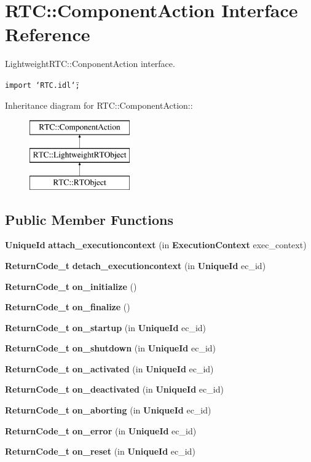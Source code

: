 \section{RTC::Component\-Action Interface Reference}
\label{interfaceRTC_1_1ComponentAction}
Lightweight\-RTC::Conponent\-Action interface.  


{\tt import \char`\"{}RTC.idl\char`\"{};}

Inheritance diagram for RTC::Component\-Action::\begin{figure}[H]
\begin{center}
\leavevmode
\includegraphics[height=3cm]{interfaceRTC_1_1ComponentAction}
\end{center}
\end{figure}
\subsection*{Public Member Functions}
\begin{CompactItemize}
\item 
{\bf Unique\-Id} {\bf attach\_\-executioncontext} (in {\bf Execution\-Context} exec\_\-context)
\item 
{\bf Return\-Code\_\-t} {\bf detach\_\-executioncontext} (in {\bf Unique\-Id} ec\_\-id)
\item 
{\bf Return\-Code\_\-t} {\bf on\_\-initialize} ()
\item 
{\bf Return\-Code\_\-t} {\bf on\_\-finalize} ()
\item 
{\bf Return\-Code\_\-t} {\bf on\_\-startup} (in {\bf Unique\-Id} ec\_\-id)
\item 
{\bf Return\-Code\_\-t} {\bf on\_\-shutdown} (in {\bf Unique\-Id} ec\_\-id)
\item 
{\bf Return\-Code\_\-t} {\bf on\_\-activated} (in {\bf Unique\-Id} ec\_\-id)
\item 
{\bf Return\-Code\_\-t} {\bf on\_\-deactivated} (in {\bf Unique\-Id} ec\_\-id)
\item 
{\bf Return\-Code\_\-t} {\bf on\_\-aborting} (in {\bf Unique\-Id} ec\_\-id)
\item 
{\bf Return\-Code\_\-t} {\bf on\_\-error} (in {\bf Unique\-Id} ec\_\-id)
\item 
{\bf Return\-Code\_\-t} {\bf on\_\-reset} (in {\bf Unique\-Id} ec\_\-id)
\end{CompactItemize}


